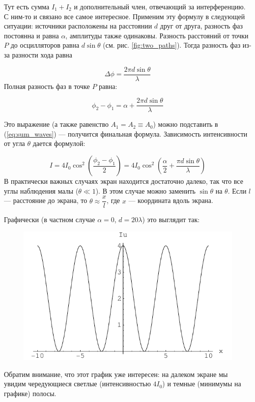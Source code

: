 \documentclass[11pt,a4paper]{article}
\numberwithin{equation}{section}
\begin{document}
Тут есть сумма $I_1 + I_2$ и дополнительный член, отвечающий за
интерференцию. С ним-то и связано все самое интересное. Применим эту
формулу в следующей ситуации: источники расположены на расстоянии $d$
друг от друга, разность фаз постоянна и равна $\alpha$, амплитуды
также одинаковы. Разность расстояний от точки $P$ до осцилляторов
равна $d\sin \theta$ (см. рис. \ref{fig:two_paths}). Тогда разность фаз
из-за разности хода равна

\begin{equation}
\Delta \phi = \frac{2\pi d \sin \theta}{\lambda}
\end{equation}
Полная разность фаз в точке $P$ равна:

\begin{equation}
\phi_2 - \phi_1 = \alpha + \frac{2\pi d \sin \theta}{\lambda}
\end{equation}

Это выражение (а также равенство $A_1 = A_2 \equiv A_0$) можно подставить в (\ref{eq:sum_waves}) --- получится финальная формула. Зависимость интенсивности от угла $\theta$ дается формулой:

\begin{equation}
I = 4I_0 \cos^2 \left( \frac{\phi_2 - \phi_1}{2} \right) = 4I_0 \cos^2 \left( \frac{\alpha}{2} + \frac{\pi d \sin \theta}{\lambda} \right) 
\end{equation}
В практически важных случаях экран находится достаточно далеко, так что все углы наблюдения малы ($\theta \ll 1$). В этом случае можно заменить $\sin \theta$ на $\theta$. Если $l$ --- расстояние до экрана, то $\theta \approx \dfrac{x}{l}$, где $x$ --- координата вдоль экрана.

Графически (в частном случае $\alpha = 0$, $d = 20 \lambda $) это выглядит так: 

\begin{figure}[h]
  \centering
  \includegraphics[scale=1]{interference_plot.pdf}
\end{figure}

Обратим внимание, что этот график уже интересен: на далеком экране мы
увидим чередующиеся светлые (интенсивностью $4I_0$) и темные (минимумы
на графике) полосы.
\end{document}
